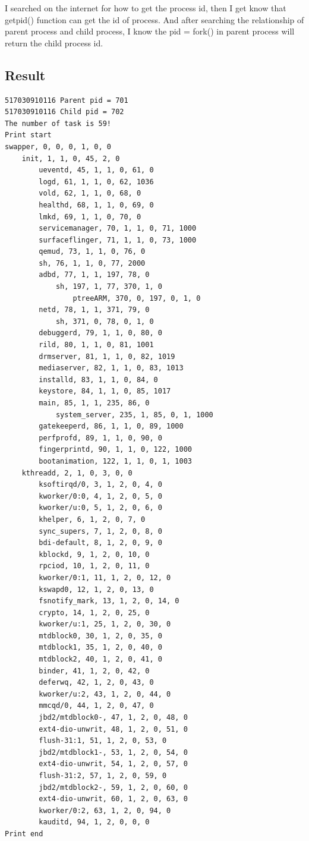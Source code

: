 \documentclass[a4paper,oneside,12pt]{article}
\begin{document}
I searched on the internet for how to get the process id, then I get know that getpid() function can get the id of process. And after searching the relationship of parent process and child process, I know the pid = fork() in parent process will return the child process id.

\subsection{Result}

\begin{lstlisting}
517030910116 Parent pid = 701
517030910116 Child pid = 702
The number of task is 59!
Print start
swapper, 0, 0, 0, 1, 0, 0
	init, 1, 1, 0, 45, 2, 0
		ueventd, 45, 1, 1, 0, 61, 0
		logd, 61, 1, 1, 0, 62, 1036
		vold, 62, 1, 1, 0, 68, 0
		healthd, 68, 1, 1, 0, 69, 0
		lmkd, 69, 1, 1, 0, 70, 0
		servicemanager, 70, 1, 1, 0, 71, 1000
		surfaceflinger, 71, 1, 1, 0, 73, 1000
		qemud, 73, 1, 1, 0, 76, 0
		sh, 76, 1, 1, 0, 77, 2000
		adbd, 77, 1, 1, 197, 78, 0
			sh, 197, 1, 77, 370, 1, 0
				ptreeARM, 370, 0, 197, 0, 1, 0
		netd, 78, 1, 1, 371, 79, 0
			sh, 371, 0, 78, 0, 1, 0
		debuggerd, 79, 1, 1, 0, 80, 0
		rild, 80, 1, 1, 0, 81, 1001
		drmserver, 81, 1, 1, 0, 82, 1019
		mediaserver, 82, 1, 1, 0, 83, 1013
		installd, 83, 1, 1, 0, 84, 0
		keystore, 84, 1, 1, 0, 85, 1017
		main, 85, 1, 1, 235, 86, 0
			system_server, 235, 1, 85, 0, 1, 1000
		gatekeeperd, 86, 1, 1, 0, 89, 1000
		perfprofd, 89, 1, 1, 0, 90, 0
		fingerprintd, 90, 1, 1, 0, 122, 1000
		bootanimation, 122, 1, 1, 0, 1, 1003
	kthreadd, 2, 1, 0, 3, 0, 0
		ksoftirqd/0, 3, 1, 2, 0, 4, 0
		kworker/0:0, 4, 1, 2, 0, 5, 0
		kworker/u:0, 5, 1, 2, 0, 6, 0
		khelper, 6, 1, 2, 0, 7, 0
		sync_supers, 7, 1, 2, 0, 8, 0
		bdi-default, 8, 1, 2, 0, 9, 0
		kblockd, 9, 1, 2, 0, 10, 0
		rpciod, 10, 1, 2, 0, 11, 0
		kworker/0:1, 11, 1, 2, 0, 12, 0
		kswapd0, 12, 1, 2, 0, 13, 0
		fsnotify_mark, 13, 1, 2, 0, 14, 0
		crypto, 14, 1, 2, 0, 25, 0
		kworker/u:1, 25, 1, 2, 0, 30, 0
		mtdblock0, 30, 1, 2, 0, 35, 0
		mtdblock1, 35, 1, 2, 0, 40, 0
		mtdblock2, 40, 1, 2, 0, 41, 0
		binder, 41, 1, 2, 0, 42, 0
		deferwq, 42, 1, 2, 0, 43, 0
		kworker/u:2, 43, 1, 2, 0, 44, 0
		mmcqd/0, 44, 1, 2, 0, 47, 0
		jbd2/mtdblock0-, 47, 1, 2, 0, 48, 0
		ext4-dio-unwrit, 48, 1, 2, 0, 51, 0
		flush-31:1, 51, 1, 2, 0, 53, 0
		jbd2/mtdblock1-, 53, 1, 2, 0, 54, 0
		ext4-dio-unwrit, 54, 1, 2, 0, 57, 0
		flush-31:2, 57, 1, 2, 0, 59, 0
		jbd2/mtdblock2-, 59, 1, 2, 0, 60, 0
		ext4-dio-unwrit, 60, 1, 2, 0, 63, 0
		kworker/0:2, 63, 1, 2, 0, 94, 0
		kauditd, 94, 1, 2, 0, 0, 0
Print end

\end{lstlisting}
\end{document}
